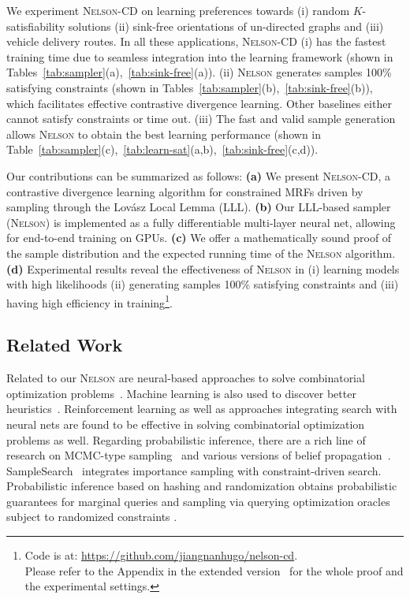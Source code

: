 \documentclass[letterpaper]{article} %
\newcommand{\lovasz}{{Lov\'asz}\xspace}
\newcommand{\nls}{\textsc{Nelson}\xspace}
\begin{document}
We experiment \nls-CD on learning preferences towards (i) random $K$-satisfiability solutions (ii) sink-free orientations of un-directed graphs and (iii) vehicle delivery routes. 
%
In all these applications, \nls-CD 
(i) has the fastest training time due to seamless integration into the learning framework (shown in Tables~\ref{tab:sampler}(a),~\ref{tab:sink-free}(a)).  (ii) \nls generates samples 100\% satisfying constraints 
 (shown in Tables~\ref{tab:sampler}(b),~\ref{tab:sink-free}(b)), which facilitates effective contrastive divergence learning. Other baselines either cannot satisfy constraints or time out. (iii) The fast and valid sample generation allows \nls to obtain the best  learning performance (shown in Table~\ref{tab:sampler}(c),~\ref{tab:learn-sat}(a,b),~\ref{tab:sink-free}(c,d)). 

Our contributions can be summarized as follows: 
\textbf{(a)} We present \nls-CD, a contrastive divergence learning algorithm for constrained MRFs driven by sampling through the \lovasz Local Lemma (LLL). \textbf{(b)} Our LLL-based sampler (\nls) is implemented as a fully differentiable multi-layer neural net, allowing for end-to-end training on GPUs. \textbf{(c)} We offer a mathematically sound proof of the sample distribution and the expected running time of the \nls algorithm.
\textbf{(d)} Experimental results reveal the effectiveness of \nls in  (i) learning models  with high likelihoods (ii) generating samples 100\% satisfying constraints and (iii) having high efficiency in training\footnote{Code is at: \url{https://github.com/jiangnanhugo/nelson-cd}.\\ {Please refer to the Appendix in the extended version~\cite{nanyiye2022} for the whole proof and the experimental settings.}}.

\subsection{Related Work}

Related to our \nls are neural-based approaches to solve combinatorial optimization problems~\cite{DBLP:conf/iclr/SelsamLBLMD19,DBLP:conf/icml/DuanVPRM22,DBLP:conf/nips/LiCK18}. 
%
Machine learning is also used to discover better heuristics~\cite{DBLP:conf/nips/YolcuP19,DBLP:conf/nips/ChenT19}.
%
Reinforcement learning \cite{DBLP:conf/nips/KaraliasL20,DBLP:journals/eor/BengioLP21} as well as approaches integrating search with neural nets \cite{DBLP:conf/aaai/MandiDSG20} are found to be effective in solving combinatorial optimization problems as well.
%
Regarding probabilistic inference, there are a rich line of research  on  MCMC-type sampling~\cite{neal1993probabilistic,DBLP:journals/pami/DagumC93,pmlr-v84-ge18b} and various versions of belief propagation~\cite{murphy1999loopy,DBLP:journals/jmlr/IhlerFW05,DBLP:journals/corr/abs-2011-02303,pmlr-v138-fan20a}. 
%
SampleSearch~\cite{DBLP:journals/ai/GogateD11} integrates importance sampling with  constraint-driven search.
%
Probabilistic inference based on hashing and randomization obtains probabilistic guarantees for marginal queries and sampling via querying optimization oracles subject to randomized constraints \cite{Gomes2006Sampling,Ermon13Wish,DBLP:conf/sat/AchlioptasT17,Chakraborty2013scalable}.  
\end{document}
